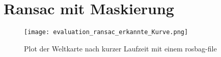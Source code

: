 \section{Ransac mit Maskierung}

\begin{figure}[H] %
  \centering
  \texttt{[image: evaluation\_ransac\_erkannte\_Kurve.png]}
  \caption{Plot der Weltkarte nach kurzer Laufzeit mit einem rosbag-file}
\label{evaluation_ransac_weltkarte_kurve}
\end{figure} 
